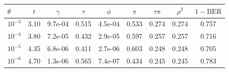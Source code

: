 \begin{tabular*}{\columnwidth}{@{\extracolsep{\fill}}lcccccccc@{}}
\toprule
$\theta$ & $t$ & $\gamma$ & $\tau$ & $\phi$ & $\pi$ & $\tau\pi$ & $\rho^2$ & $1-\mathrm{BER}$\\
\midrule
$10^{-3}$ & 3.10 & 9.7e-04 & 0.515 & 4.5e-04 & 0.533 & 0.274 & 0.274 & 0.757\\
$10^{-4}$ & 3.80 & 7.2e-05 & 0.432 & 2.9e-05 & 0.597 & 0.257 & 0.257 & 0.716\\
$10^{-5}$ & 4.35 & 6.8e-06 & 0.411 & 2.7e-06 & 0.603 & 0.248 & 0.248 & 0.705\\
$10^{-6}$ & 4.70 & 1.3e-06 & 0.565 & 7.4e-07 & 0.434 & 0.245 & 0.245 & 0.783\\
\bottomrule
\end{tabular*}
